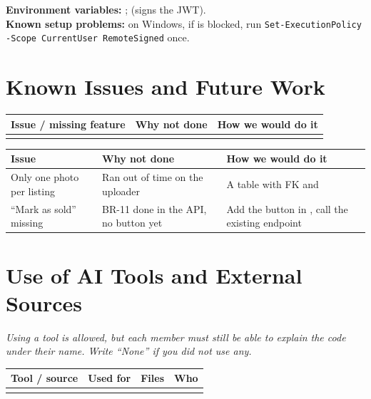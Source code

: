 \documentclass[11pt,a4paper]{article}
\newcommand{\fillin}[1]{\leavevmode{\color{fill}[#1]}}
\newcommand{\hint}[1]{{\small\color{ink2}\itshape #1\par}\medskip}
\newcommand{\code}[1]{\texttt{#1}}
\newenvironment{example}{\begin{examplebox}}{\end{examplebox}}
\begin{document}
\begin{example}
\textbf{Environment variables:} ;
 (signs the JWT).\\
\textbf{Known setup problems:} on Windows, if  is blocked, run
\code{Set-ExecutionPolicy -Scope CurrentUser RemoteSigned} once.
\end{example}

\section{Known Issues and Future Work}
{\small
\begin{tabularx}{\linewidth}{@{}Y Y Y@{}}
\toprule
Issue / missing feature & Why not done & How we would do it \\
\midrule
\fillin{ } & \fillin{ } & \fillin{ } \\
\bottomrule
\end{tabularx}}

\begin{example}
\footnotesize
\begin{tabularx}{\linewidth}{@{}Y Y Y@{}}
\toprule
Issue & Why not done & How we would do it \\
\midrule
Only one photo per listing & Ran out of time on the uploader & A  table with  FK and  \\
``Mark as sold'' missing & BR-11 done in the API, no button yet & Add the button in , call the existing endpoint \\
\bottomrule
\end{tabularx}
\end{example}

\section{Use of AI Tools and External Sources}
\hint{Using a tool is allowed, but each member must still be able to explain the code under their name.
Write ``None'' if you did not use any.}

{\small
\begin{tabularx}{\linewidth}{@{}l Y l l@{}}
\toprule
Tool / source & Used for & Files & Who \\
\midrule
\fillin{ } & \fillin{ } & \fillin{ } & \fillin{ } \\
\bottomrule
\end{tabularx}}
\end{document}
